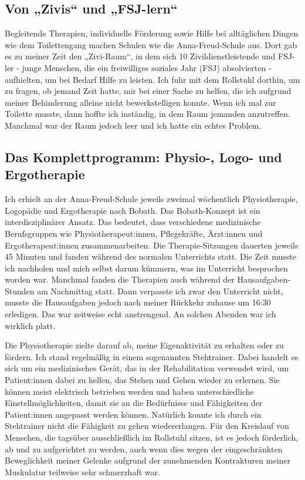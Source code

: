 \documentclass[fontsize=14pt,a4paper,headinclude,DIV=calc,automark]{scrbook}
\begin{document}
\subsection{Von „Zivis“ und „FSJ-lern“}

Begleitende Therapien, individuelle Förderung sowie Hilfe bei alltäglichen Dingen wie dem Toilettengang machen Schulen wie die Anna-Freud-Schule aus. Dort gab es zu meiner Zeit den „Zivi-Raum“, in dem sich 10 Zivildienstleistende und FSJ-ler - junge Menschen, die ein freiwilliges soziales Jahr (FSJ) absolvierten - aufhielten, um bei Bedarf Hilfe zu leisten. Ich fuhr mit dem Rollstuhl dorthin, um zu fragen, ob jemand Zeit hatte, mir bei einer Sache zu helfen, die ich aufgrund meiner Behinderung alleine nicht bewerkstelligen konnte. Wenn ich mal zur Toilette musste, dann hoffte ich inständig, in dem Raum jemanden anzutreffen. Manchmal war der Raum jedoch leer und ich hatte ein echtes Problem.

\subsection{Das Komplettprogramm: Physio-, Logo- und Ergotherapie}

Ich erhielt an der Anna-Freud-Schule jeweils zweimal wöchentlich Physiotherapie, Logopädie und Ergotherapie nach Bobath. Das Bobath-Konzept ist ein interdisziplinärer Ansatz. Das bedeutet, dass verschiedene medizinische Berufsgruppen wie Physiotherapeut:innen, Pflegekräfte, Ärzt:innen und Ergotherapeut:innen zusammenarbeiten. Die Therapie-Sitzungen dauerten jeweils 45 Minuten und fanden während des normalen Unterrichts statt. Die Zeit musste ich nachholen und mich selbst darum kümmern, was im Unterricht besprochen worden war. Manchmal fanden die Therapien auch während der Hausaufgaben-Stunden am Nachmittag statt. Dann verpasste ich zwar den Unterricht nicht, musste die Hausaufgaben jedoch nach meiner Rückkehr zuhause um 16:30 erledigen. Das war zeitweise echt anstrengend. An solchen Abenden war ich wirklich platt.

Die Physiotherapie zielte darauf ab, meine Eigenaktivität zu erhalten oder zu fördern. Ich stand regelmäßig in einem sogenannten Stehtrainer. Dabei handelt es sich um ein medizinisches Gerät, das in der Rehabilitation verwendet wird, um Patient:innen dabei zu helfen, das Stehen und Gehen wieder zu erlernen. Sie können meist elektrisch betrieben werden und haben unter­schiedliche Einstellmöglichkeiten, damit sie an die Bedürfnisse und Fähigkeiten der Patient:innen angepasst werden können. Natürlich konnte ich durch ein Stehtrainer nicht die Fähigkeit zu gehen wiedererlangen. Für den Kreislauf von Menschen, die tagsüber ausschließlich im Rollstuhl sitzen, ist es jedoch förderlich, ab und zu aufgerichtet zu werden, auch wenn dies wegen der eingeschränkten Beweglichkeit meiner Gelenke aufgrund der zunehmenden Kontrakturen meiner Muskulatur teilweise sehr schmerzhaft war.
\end{document}
